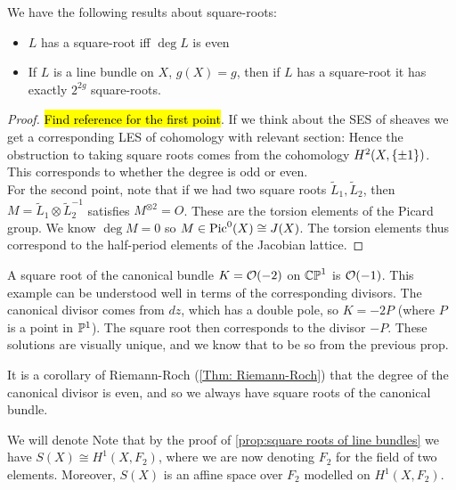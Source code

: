 \documentclass{article}
\begin{document}
\begin{prop}\label{prop:square roots of line bundles}
	We have the following results about square-roots:
	\begin{itemize}
		\item $L$ has a square-root iff $\deg L$ is even
		\item If $L$ is a line bundle on $X$, $g(X)=g$, then if $L$ has a square-root it has exactly $2^{2g}$ square-roots. 
	\end{itemize}
\end{prop}
\begin{proof}
	\hl{Find reference for the first point}. If we think about the SES of sheaves 
	we get a corresponding LES of cohomology with relevant section:
	Hence the obstruction to taking square roots comes from the cohomology $H^2(X,\left\{ \pm 1 \right\})$. This corresponds to whether the degree is odd or even. \\
	For the second point, note that if we had two square roots $\tilde{L}_1, \tilde{L}_2$, then $M=\tilde{L}_1 \otimes \tilde{L}_2^{-1}$ satisfies $M^{\otimes 2}=O$. These are the torsion elements of the Picard group. We know $\deg M=0$ so $M \in \operatorname{Pic}^0(X) \cong J(X)$. The torsion elements thus correspond to the half-period elements of the Jacobian lattice. 
\end{proof}

\begin{example}
	A square root of the canonical bundle $K=\mathcal{O}(-2)$ on $\mathbb{CP}^1$ is $\mathcal{O}(-1)$. This example can be understood well in terms of the corresponding divisors. The canonical divisor comes from $dz$, which has a double pole, so $K=-2P$ (where $P$ is a point in $\mathbb{P}^1$). The square root then corresponds to the divisor $-P$. These solutions are visually unique, and we know that to be so from the previous prop.  
\end{example}

\begin{remark}
	It is a corollary of Riemann-Roch (\ref{Thm: Riemann-Roch}) that the degree of the canonical divisor is even, and so we always have square roots of the canonical bundle. 
\end{remark}
\begin{notation}
	We will denote
Note that by the proof of \ref{prop:square roots of line bundles} we have $S(X) \cong H^1(X,F_2)$, where we are now denoting $F_2$ for the field of two elements. Moreover, $S(X)$ is an affine space over $F_2$ modelled on $H^1(X,F_2)$. 
\end{notation}
\end{document}
